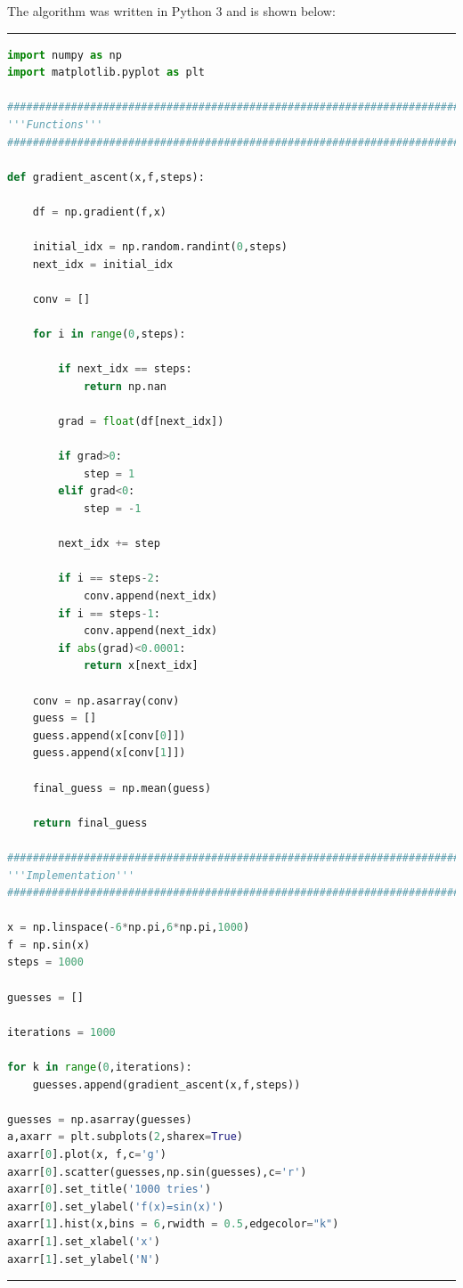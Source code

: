 \documentclass{article}
\begin{document}
The algorithm was written in Python 3 and is shown below:

\newpage

\noindent\rule{\textwidth}{1pt}
\begin{lstlisting}[language=Python]
import numpy as np
import matplotlib.pyplot as plt

#######################################################################
'''Functions'''
#######################################################################

def gradient_ascent(x,f,steps):

    df = np.gradient(f,x)
    
    initial_idx = np.random.randint(0,steps)
    next_idx = initial_idx
    
    conv = []
    
    for i in range(0,steps):
        
        if next_idx == steps:
            return np.nan
    
        grad = float(df[next_idx])
        
        if grad>0:
            step = 1
        elif grad<0:
            step = -1
        
        next_idx += step
        
        if i == steps-2:
            conv.append(next_idx)
        if i == steps-1:
            conv.append(next_idx)
        if abs(grad)<0.0001:
            return x[next_idx]
            
    conv = np.asarray(conv)    
    guess = []
    guess.append(x[conv[0]])
    guess.append(x[conv[1]])
    
    final_guess = np.mean(guess)
    
    return final_guess

#######################################################################
'''Implementation'''
#######################################################################

x = np.linspace(-6*np.pi,6*np.pi,1000)
f = np.sin(x)
steps = 1000

guesses = []

iterations = 1000

for k in range(0,iterations):
    guesses.append(gradient_ascent(x,f,steps))

guesses = np.asarray(guesses)
a,axarr = plt.subplots(2,sharex=True)
axarr[0].plot(x, f,c='g')
axarr[0].scatter(guesses,np.sin(guesses),c='r')
axarr[0].set_title('1000 tries')
axarr[0].set_ylabel('f(x)=sin(x)')
axarr[1].hist(x,bins = 6,rwidth = 0.5,edgecolor="k")
axarr[1].set_xlabel('x')
axarr[1].set_ylabel('N')
\end{lstlisting}
\noindent\rule{\textwidth}{1pt}
\end{document}
